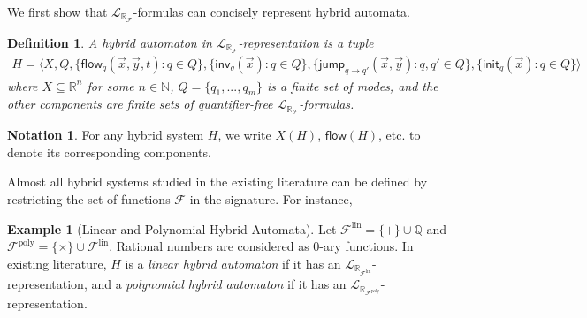 \documentclass[12pt]{article}
\theoremstyle{plain}
\newtheorem{definition}[theorem]{Definition}
\theoremstyle{definition}
\newtheorem{example}[theorem]{Example}
\newtheorem{notation}[theorem]{Notation}
\newcommand{\flow}{\mathsf{flow}}
\newcommand{\jump}{\mathsf{jump}}
\newcommand{\inv}{\mathsf{inv}}
\newcommand{\init}{\mathsf{init}}
\newcommand{\lrf}{\mathcal{L}_{\mathbb{R}_{\mathcal{F}}}}
\begin{document}
We first show that $\lrf$-formulas can concisely represent hybrid automata.
\begin{definition}\label{lrf-definition}
A hybrid automaton in $\lrf$-representation is a tuple
\begin{multline*}
H = \langle X, Q, \{{\flow}_q(\vec x, \vec y, t): q\in Q\},\{\inv_q(\vec x): q\in Q\},
\{\jump_{q\rightarrow q'}(\vec x, \vec y): q,q'\in Q\},\{\init_q(\vec x): q\in Q\}\rangle
\end{multline*}
where $X\subseteq \mathbb{R}^n$ for some $n\in \mathbb{N}$, $Q=\{q_1,...,q_m\}$ is a finite set of modes, and the other components are finite sets of quantifier-free $\lrf$-formulas.
\end{definition}
\begin{notation}
For any hybrid system $H$, we write $X(H)$, $\flow(H)$, etc. to denote its corresponding components.
\end{notation}
Almost all hybrid systems studied in the existing literature can be defined by restricting the set of functions $\mathcal{F}$ in the signature. For instance,
\begin{example}[Linear and Polynomial Hybrid Automata] Let $\mathcal{F}^{\mathrm{lin}} = \{+\}\cup \mathbb{Q}$ and $\mathcal{F}^{\mathrm{poly}}=\{\times\}\cup\mathcal{F}^{\mathrm{lin}}$. Rational numbers are considered as 0-ary functions. In existing literature, $H$ is a {\em linear hybrid automaton} if it has an $\mathcal{L}_{\mathbb{R}_{\mathcal{F}^{\mathrm{lin}}}}$-representation, and a {\em polynomial hybrid automaton} if it has an $\mathcal{L}_{\mathbb{R}_{\mathcal{F}^{\mathrm{poly}}}}$-representation.
\end{example}
\end{document}
